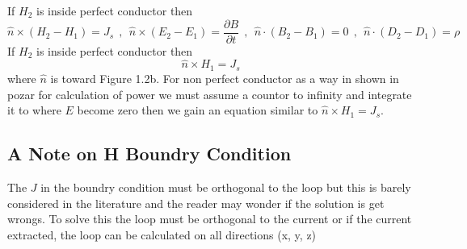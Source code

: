 If $H_2$ is inside perfect conductor then 
\setlength{\abovedisplayshortskip}{7pt}
\setlength{\belowdisplayshortskip}{7pt}
\setlength{\abovedisplayskip}{7pt}
\setlength{\belowdisplayskip}{7pt}
$$\hat{n} \times ( H_2 - H_1 ) = J_s ~~ , ~~ \hat{n} \times ( E_2 - E_1 ) = \frac{\partial B}{\partial t} ~~ , ~~ \hat{n} \cdot ( B_2 - B_1 ) = 0 ~~ , ~~ \hat{n} \cdot ( D_2 - D_1 ) = \rho $$
If $H_2$ is inside perfect conductor then 
$$ \hat{n} \times H_1 = J_s $$
where $\hat{n}$ is toward \cite{inan} Figure 1.2b. For non perfect conductor as a way in shown in pozar for calculation of power we must assume a countor to infinity and integrate it to where $E$ become zero then we gain an equation similar to $ \hat{n} \times H_1 = J_s $.

\subsection{A Note on H Boundry Condition}
The $J$ in the boundry condition must be orthogonal to the loop but this is barely considered in the literature and the reader may wonder if the solution is get wrongs. To solve this the loop must be orthogonal to the current or if the current extracted, the loop can be calculated on all directions (x, y, z)
